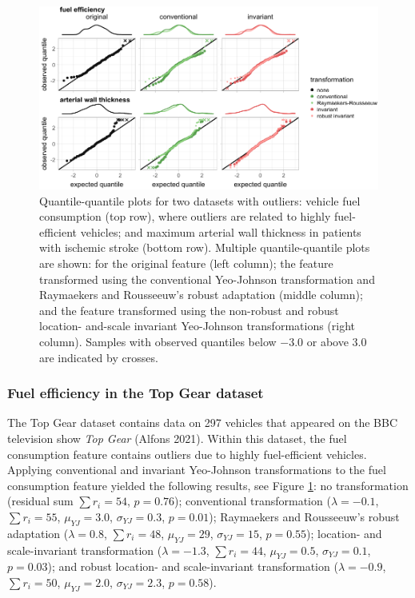 \documentclass[preprint,12pt,authoryear]{elsarticle}
\begin{document}
\begin{figure}

{\centering \includegraphics{figure_9} 

}

\caption{Quantile-quantile plots for two datasets with outliers: vehicle fuel consumption (top row), where outliers are related to highly fuel-efficient vehicles; and maximum arterial wall thickness in patients with ischemic stroke (bottom row). Multiple quantile-quantile plots are shown: for the original feature (left column); the feature transformed using the conventional Yeo-Johnson transformation and Raymaekers and Rousseeuw's robust adaptation (middle column); and the feature transformed using the non-robust and robust location- and-scale invariant Yeo-Johnson transformations (right column). Samples with observed quantiles below $-3.0$ or above $3.0$ are indicated by crosses.}\label{fig:experimental-results-outlier-robustness}
\end{figure}

\subsubsection{Fuel efficiency in the Top Gear
dataset}\label{fuel-efficiency-in-the-top-gear-dataset}

The Top Gear dataset contains data on 297 vehicles that appeared on the
BBC television show \emph{Top Gear} (Alfons 2021). Within this dataset,
the fuel consumption feature contains outliers due to highly
fuel-efficient vehicles. Applying conventional and invariant Yeo-Johnson
transformations to the fuel consumption feature yielded the following
results, see Figure \ref{fig:experimental-results-outlier-robustness}:
no transformation (residual sum \(\sum r_i = 54\), \(p=0.76\));
conventional transformation (\(\lambda = -0.1\), \(\sum r_i = 55\),
\(\mu_{YJ} = 3.0\), \(\sigma_{YJ} = 0.3\), \(p=0.01\)); Raymaekers and
Rousseeuw's robust adaptation (\(\lambda = 0.8\), \(\sum r_i = 48\),
\(\mu_{YJ} = 29\), \(\sigma_{YJ} = 15\), \(p=0.55\)); location- and
scale-invariant transformation (\(\lambda = -1.3\), \(\sum r_i = 44\),
\(\mu_{YJ} = 0.5\), \(\sigma_{YJ} = 0.1\), \(p=0.03\)); and robust
location- and scale-invariant transformation (\(\lambda = -0.9\),
\(\sum r_i = 50\), \(\mu_{YJ} = 2.0\), \(\sigma_{YJ} = 2.3\),
\(p=0.58\)).
\end{document}
